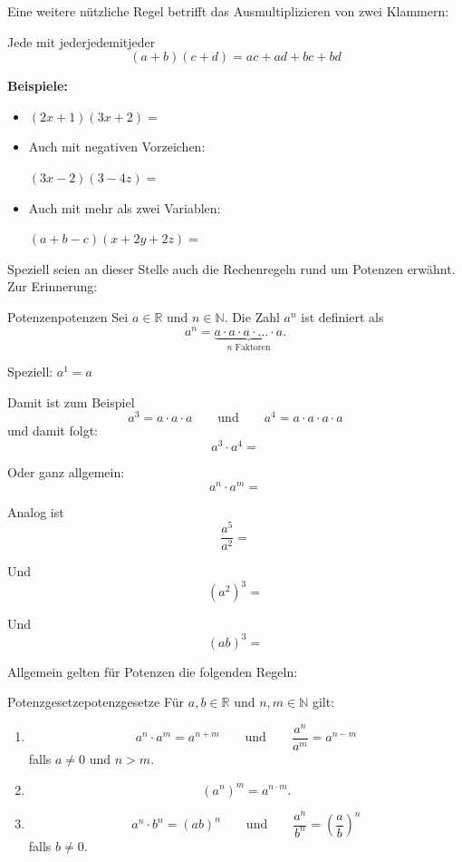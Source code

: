 Eine weitere nützliche Regel betrifft das Ausmultiplizieren von zwei Klammern:

\begin{satz}{Jede mit jeder}{jedemitjeder}
    \[
        (a+b)(c+d)=ac+ad+bc+bd
    \]
\end{satz}

\textbf{Beispiele:}

\begin{itemize}
    \item \((2x+1)(3x+2)=\)

    \item Auch mit negativen Vorzeichen:

          \(
          (3x-2)(3-4z)=
          \)

    \item Auch mit mehr als zwei Variablen:

          \(
          (a+b-c)(x+2y+2z)=
          \)
\end{itemize}


Speziell seien an dieser Stelle auch die Rechenregeln rund um Potenzen erwähnt. Zur Erinnerung:

\begin{definition}{Potenzen}{potenzen}
    Sei \(a \in \mathbb{R}\) und \(n \in \mathbb{N}\). Die Zahl \(a^n\) ist definiert als
    \[
        a^n
        =
        \underbrace{a \cdot a \cdot a \cdot \ldots \cdot a}_{n\text{ Faktoren}}.
    \]

    Speziell: \(a^1=a\)
\end{definition}

Damit ist zum Beispiel
\[
    a^3=a\cdot a\cdot a
    \qquad\text{und}\qquad
    a^4=a\cdot a\cdot a\cdot a
\]
und damit folgt:
\[
    a^3\cdot a^4=
\]

Oder ganz allgemein:
\[
    a^n\cdot a^m=
\]

Analog ist
\[
    \frac{a^5}{a^2}=
\]

Und
\[
    (a^2)^3=
\]

Und
\[
    (ab)^3=
\]

Allgemein gelten für Potenzen die folgenden Regeln:

\begin{satz}{Potenzgesetze}{potenzgesetze}
    Für \(a,b\in\mathbb{R}\) und \(n,m\in\mathbb{N}\) gilt:
    \begin{enumerate}
        \item
              \[
                  a^n\cdot a^m=a^{n+m}
                  \qquad\text{und}\qquad
                  \frac{a^n}{a^m}=a^{n-m}
              \]
              falls \(a\neq0\) und \(n>m\).

        \item
              \[
                  (a^n)^m=a^{n\cdot m}.
              \]

        \item
              \[
                  a^n\cdot b^n=(ab)^n
                  \qquad\text{und}\qquad
                  \frac{a^n}{b^n}
                  =
                  \left(\frac{a}{b}\right)^n
              \]
              falls \(b\neq0\).
    \end{enumerate}
\end{satz}

